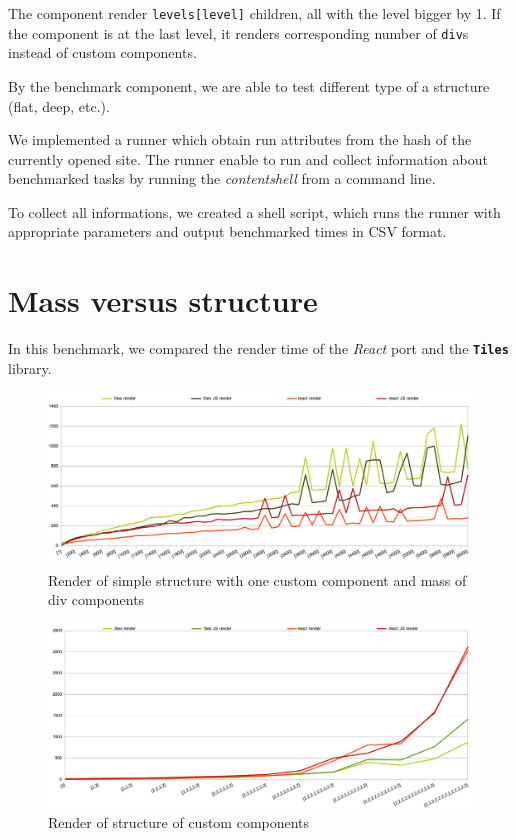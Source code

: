 \documentclass[oneside, 12pt]{book}
\newcommand{\tiles}[0]{\textbf{\texttt{Tiles}} }
\newcommand{\react}[0]{\textit{React} }
\begin{document}
The component render \texttt{levels[level]} children, all with the level bigger by 1.
If the component is at the last level, it renders corresponding number of \texttt{div}s instead of custom components.

By the benchmark component, we are able to test different type of a structure (flat, deep, etc.).

We implemented a runner which obtain run attributes from the hash of the currently opened site. 
The runner enable to run and collect information about benchmarked tasks by running the \textit{content\textunderscore shell} from a command line.

To collect all informations, we created a shell script, which runs the runner with appropriate parameters and output benchmarked times in CSV format.

\section{Mass versus structure}\label{sec:benchmarks-mass-vs-structure}

	In this benchmark, we compared the render time of the \react port and the \tiles library.
	\begin{figure}[h]
	\centering  
		\includegraphics[scale=0.5]{images/benchmarks/m_render.png}
		\caption{Render of simple structure with one custom component and mass of div components}
		\label{img:benchmarks-mass-render}
	\end{figure}

	\begin{figure}[h]
	\centering  
		\includegraphics[scale=0.5]{images/benchmarks/s_render.png}
		\caption{Render of structure of custom components}
		\label{img:benchmarks-structure-render}
	\end{figure}
\end{document}
